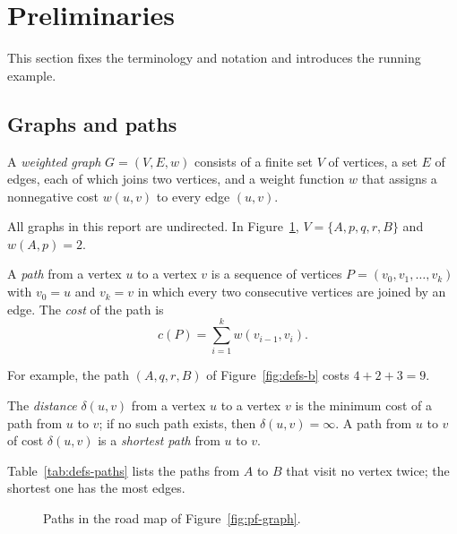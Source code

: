 \section{Preliminaries}\label{sec:prelim}

This section fixes the terminology and notation and introduces the running
example.

\subsection{Graphs and paths}\label{sec:def-graph}

\begin{definition}\label{def:graph}
A \emph{weighted graph} $G = (V, E, w)$ consists of a finite set $V$ of
vertices, a set $E$ of edges, each of which joins two vertices, and a weight
function $w$ that assigns a nonnegative cost $w(u,v)$ to every edge $(u,v)$.
\end{definition}

All graphs in this report are undirected. In Figure~\ref{fig:defs},
$V = \{A, p, q, r, B\}$ and $w(A,p) = 2$.

\begin{definition}\label{def:path}
A \emph{path} from a vertex $u$ to a vertex $v$ is a sequence of vertices
$P = (v_0, v_1, \dots, v_k)$ with $v_0 = u$ and $v_k = v$ in which every two
consecutive vertices are joined by an edge. The \emph{cost} of the path is
\begin{equation}\label{eq:pathcost}
  c(P) = \sum_{i=1}^{k} w(v_{i-1}, v_i).
\end{equation}
\end{definition}

For example, the path $(A, q, r, B)$ of Figure~\ref{fig:defs-b} costs
$4 + 2 + 3 = 9$.

\begin{definition}\label{def:shortest}
The \emph{distance} $\delta(u,v)$ from a vertex $u$ to a vertex $v$ is the
minimum cost of a path from $u$ to $v$; if no such path exists, then
$\delta(u,v) = \infty$. A path from $u$ to $v$ of cost $\delta(u,v)$ is a
\emph{shortest path} from $u$ to $v$.
\end{definition}

Table~\ref{tab:defs-paths} lists the paths from $A$ to $B$ that visit no vertex
twice; the shortest one has the most edges.

\begin{figure}[htbp]
  \centering
  
  \caption{Paths in the road map of Figure~\ref{fig:pf-graph}.}\label{fig:defs}
\end{figure}

